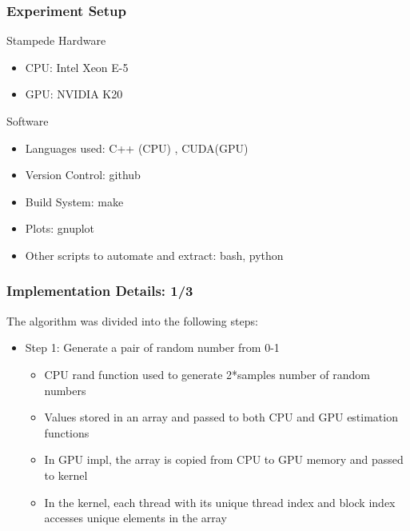 \documentclass[mathserif]{beamer}
\begin{document}
\begin{frame}                                                                                                                                                                          
\frametitle{Experiment Setup}
\begin{block}{Stampede Hardware}
\begin{itemize}
\item CPU: Intel Xeon E-5 
\item GPU: NVIDIA K20 
\end{itemize}
\end{block}
\begin{block}{Software}
\begin{itemize}
\item Languages used: C++ (CPU) , CUDA(GPU) 
\item Version Control: github
\item Build System: make 
\item Plots: gnuplot  
\item Other scripts to automate and extract: bash, python  
\end{itemize}
\end{block}
\end{frame}              

\begin{frame}                                                                                                                                                                          
\frametitle{Implementation Details: 1/3}
The algorithm was divided into the following steps:
\begin{itemize}
\item Step 1: Generate a pair of random number from 0-1
\begin{itemize}
\item CPU rand function used to generate 2*samples number of random numbers  
\item Values stored in an array and passed to both CPU and GPU estimation functions
\item In GPU impl, the array is copied from CPU to GPU memory and passed to kernel
\item In the kernel, each thread with its unique thread index and block index accesses unique elements in the array
\end{itemize}
\end{itemize}
\end{frame}              
\end{document}
